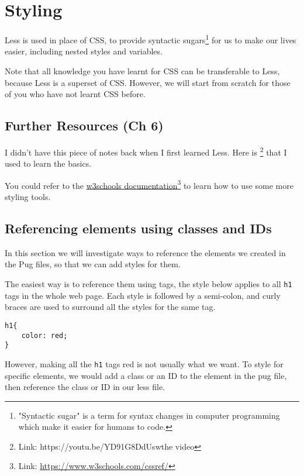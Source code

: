 \chapter{Styling}
\label{sec:ch6}

Less is used in place of CSS, to provide syntactic sugars\footnote{"Syntactic sugar" is a term for syntax changes in computer programming which make it easier for humans to code.} for us to make our lives easier, including nested styles and variables. 

Note that all knowledge you have learnt for CSS can be transferable to Less, because Less is a superset of CSS. However, we will start from scratch for those of you who have not learnt CSS before.

\section{Further Resources (Ch 6)}

I didn't have this piece of notes back when I first learned Less. Here is \href{https://youtu.be/YD91G8DdUsw}\footnote{Link: \url{https://youtu.be/YD91G8DdUsw}{the video}} that I used to learn the basics. 

You could refer to the \href{https://www.w3schools.com/cssref/}{w3schools documentation}\footnote{Link: \url{https://www.w3schools.com/cssref/}} to learn how to use some more styling tools.

\section{Referencing elements using classes and IDs}

In this section we will investigate ways to reference the elements we created in the Pug files, so that we can add styles for them.

The easiest way is to reference them using tags, the style below applies to all \texttt{h1} tags in the whole web page. Each style is followed by a semi-colon, and curly braces are used to surround all the styles for the same tag.

\begin{lstlisting}[language=pug]
h1{
    color: red;
}
\end{lstlisting}

However, making all the \texttt{h1} tags red is not usually what we want. To style for specific elements, we would add a class or an ID to the element in the pug file, then reference the class or ID in our less file.

